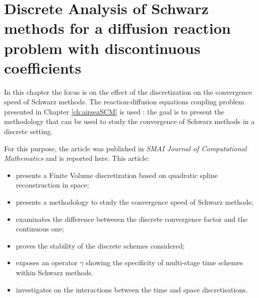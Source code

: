 \chapter{Discrete Analysis of Schwarz methods for a diffusion reaction problem with discontinuous coefficients}
\label{ch:discreteSchwarzAnalysis}
\minitoc
In this chapter the focus is on the effect of the discretization
on the convergence speed of Schwarz methods. The reaction-diffusion
equations coupling problem presented in
Chapter \ref{ch:airseaSCM} is used : the goal is
to present the methodology
that can be used to study the convergence
of Schwarz methods in a discrete setting.
\par
For this purpose, the article
\citep{clement_discrete_2022-1} was published in
\textit{SMAI Journal of Computational Mathematics} and is reported
here.
This article:
\begin{itemize}
	\item presents a Finite Volume discretization based
	on quadratic spline reconstruction in space;
	\item presents a methodology to study the convergence
	speed of Schwarz methods;
	\item examinates the difference betweeen
	the discrete convergence factor and the continuous one;
	\item proves the stability of the discrete schemes considered;
	\item exposes an operator $\gamma$ showing the specificity
	of multi-stage time schemes within Schwarz methods.
	\item investigates on the interactions between the time
		and space discretisations.
\end{itemize}
